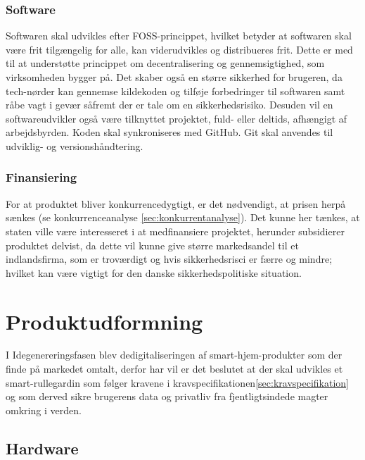 \documentclass[11pt]{article}
\begin{document}
\subsubsection{Software}
Softwaren skal udvikles efter FOSS-princippet, hvilket betyder at softwaren skal være frit tilgængelig for alle, kan viderudvikles og distribueres frit. Dette er med til at understøtte princippet om decentralisering og gennemsigtighed, som virksomheden bygger på. Det skaber også en større sikkerhed for brugeren, da tech-nørder kan gennemse kildekoden og tilføje forbedringer til softwaren samt råbe vagt i gevær såfremt der er tale om en sikkerhedsrisiko. Desuden vil en softwareudvikler også være tilknyttet projektet, fuld- eller deltids, afhængigt af arbejdsbyrden. Koden skal synkroniseres med GitHub. Git skal anvendes til udviklig- og versionshåndtering.

\subsubsection{Finansiering}
\label{sec:finansiering}
For at produktet bliver konkurrencedygtigt, er det nødvendigt, at prisen herpå sænkes (se konkurrenceanalyse \ref{sec:konkurrentanalyse}). Det kunne her tænkes, at staten ville være interesseret i at medfinansiere projektet, herunder subsidierer produktet delvist, da dette vil kunne give større markedsandel til et indlandsfirma, som er troværdigt og hvis sikkerhedsrisci er færre og mindre; hvilket kan være vigtigt for den danske sikkerhedspolitiske situation.
\newpage

\section{Produktudformning}
\label{sec:org563ee9e}
I Idegenereringsfasen blev dedigitaliseringen af smart-hjem-produkter som der finde på markedet omtalt, derfor har vil er det beslutet at der skal udvikles et smart-rullegardin som følger kravene i kravspecifikationen\ref{sec:kravspecifikation} og som derved sikre brugerens data og privatliv fra fjentligtsindede magter omkring i verden.

\subsection{Hardware}
\label{sec:orgdbd4fd8}
\end{document}
